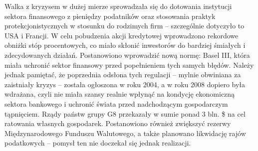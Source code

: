 Walka z kryzysem w dużej mierze sprowadzała się do dotowania instytucji sektora finansowego z pieniędzy podatników oraz stosowania praktyk protekcjonistycznych w stosunku do rodzimych firm – szczególnie dotyczyło to USA i Francji. W celu pobudzenia akcji kredytowej wprowadzono rekordowe obniżki stóp procentowych, co miało skłonić inwestorów do bardziej śmiałych i zdecydowanych działań.
Postanowiono wprowadzić nową normę: Basel III, która miała uchronić sektor finansowy przed popełnieniem tych samych błędów. Należy jednak pamiętać, że poprzednia odsłona tych regulacji – mylnie obwiniana za zaistniały kryzys – została ogłoszona w roku 2004, a w roku 2008 dopiero była wdrażana, czyli nie miała szansy realnie wpłynąć na kondycję ekonomiczną sektora bankowego i uchronić świata przed nadchodzącym gospodarczym tąpnięciem.
Rządy państw grupy G8 przekazały w sumie ponad 3 bln. \$ na cel ratowania własnych gospodarek. Postanowiono również zwiększyć rezerwy Międzynarodowego Funduszu Walutowego, a także planowano likwidację rajów podatkowych – pomysł ten nie doczekał się jednak realizacji.